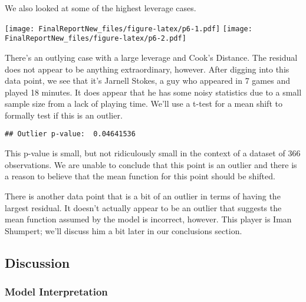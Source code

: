 \documentclass[]{article}
\begin{document}
We also looked at some of the highest leverage cases.

\texttt{[image: FinalReportNew\_files/figure-latex/p6-1.pdf]}
\texttt{[image: FinalReportNew\_files/figure-latex/p6-2.pdf]}

There's an outlying case with a large leverage and Cook's Distance. The
residual does not appear to be anything extraordinary, however. After
digging into this data point, we see that it's Jarnell Stokes, a guy who
appeared in 7 games and played 18 minutes. It does appear that he has
some noisy statistics due to a small sample size from a lack of playing
time. We'll use a t-test for a mean shift to formally test if this is an
outlier.

\begin{verbatim}
## Outlier p-value:  0.04641536
\end{verbatim}

This p-value is small, but not ridiculously small in the context of a
dataset of 366 observations. We are unable to conclude that this point
is an outlier and there is a reason to believe that the mean function
for this point should be shifted.

There is another data point that is a bit of an outlier in terms of
having the largest residual. It doesn't actually appear to be an outlier
that suggests the mean function assumed by the model is incorrect,
however. This player is Iman Shumpert; we'll discuss him a bit later in
our conclusions section.

\subsection{Discussion}\label{discussion}

\subsubsection{Model Interpretation}\label{model-interpretation}
\end{document}
